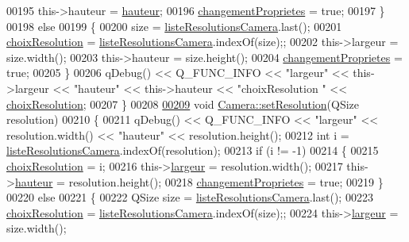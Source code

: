 \begin{DoxyCode}
00195         this->hauteur = \hyperlink{class_camera_a5d89d7f9d1a5eab4175dd168c7fbf1c7}{hauteur};
00196         \hyperlink{class_camera_a50d2b3ef5c08f8b61bbe2115d71005bd}{changementProprietes} = \textcolor{keyword}{true};
00197     \}
00198     \textcolor{keywordflow}{else}
00199     \{
00200         size = \hyperlink{class_camera_a96af62eaf7828664865b56e7c69e771c}{listeResolutionsCamera}.last();
00201         \hyperlink{class_camera_a3fdddf6f548f04d7bdc26f32602a03d4}{choixResolution} = \hyperlink{class_camera_a96af62eaf7828664865b56e7c69e771c}{listeResolutionsCamera}.indexOf(size);;
00202         this->largeur = size.width();
00203         this->hauteur = size.height();
00204         \hyperlink{class_camera_a50d2b3ef5c08f8b61bbe2115d71005bd}{changementProprietes} = \textcolor{keyword}{true};
00205     \}
00206     qDebug() << Q\_FUNC\_INFO << \textcolor{stringliteral}{"largeur"} << this->largeur << \textcolor{stringliteral}{"hauteur"} << this->hauteur << \textcolor{stringliteral}{"choixResolution
      "} << \hyperlink{class_camera_a3fdddf6f548f04d7bdc26f32602a03d4}{choixResolution};
00207 \}
00208 
\hyperlink{class_camera_a79630483bf9912a8fd1afe412ee8c848}{00209} \textcolor{keywordtype}{void} \hyperlink{class_camera_a966d13a5bf22c776f8d776d3da19182a}{Camera::setResolution}(QSize resolution)
00210 \{
00211     qDebug() << Q\_FUNC\_INFO << \textcolor{stringliteral}{"largeur"} << resolution.width() << \textcolor{stringliteral}{"hauteur"} << resolution.height();
00212     \textcolor{keywordtype}{int} i = \hyperlink{class_camera_a96af62eaf7828664865b56e7c69e771c}{listeResolutionsCamera}.indexOf(resolution);
00213     \textcolor{keywordflow}{if} (i != -1)
00214     \{
00215         \hyperlink{class_camera_a3fdddf6f548f04d7bdc26f32602a03d4}{choixResolution} = i;
00216         this->\hyperlink{class_camera_ad64f26cdfc5aa561208b273d430938cf}{largeur} = resolution.width();
00217         this->\hyperlink{class_camera_a5d89d7f9d1a5eab4175dd168c7fbf1c7}{hauteur} = resolution.height();
00218         \hyperlink{class_camera_a50d2b3ef5c08f8b61bbe2115d71005bd}{changementProprietes} = \textcolor{keyword}{true};
00219     \}
00220     \textcolor{keywordflow}{else}
00221     \{
00222         QSize size = \hyperlink{class_camera_a96af62eaf7828664865b56e7c69e771c}{listeResolutionsCamera}.last();
00223         \hyperlink{class_camera_a3fdddf6f548f04d7bdc26f32602a03d4}{choixResolution} = \hyperlink{class_camera_a96af62eaf7828664865b56e7c69e771c}{listeResolutionsCamera}.indexOf(size);;
00224         this->\hyperlink{class_camera_ad64f26cdfc5aa561208b273d430938cf}{largeur} = size.width();

\end{DoxyCode}
